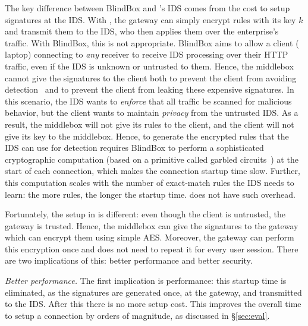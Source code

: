 The key difference between BlindBox and \sys's IDS comes from the cost to setup signatures at the IDS. 
With \sys, the gateway can simply encrypt rules with its key $k$ and transmit them to the IDS, who then applies them over the enterprise's traffic.
With BlindBox, this is not appropriate.
BlindBox aims to allow a client (\eg{} laptop) connecting to {\em any} receiver to receive IDS processing over their HTTP traffic, even if the IDS is unknown or untrusted to them.
Hence, the middlebox cannot give the signatures to the client both to prevent the client from avoiding detection~\cite{Bro} and to prevent the client from leaking these expensive signatures. 
In this scenario, the IDS wants to {\it enforce} that all traffic be scanned for malicious behavior, but the client wants to maintain {\it privacy} from the untrusted IDS.
As a result, the middlebox will not give its rules to the client, and the client will not give its key to the middlebox.
Hence,  to generate the encrypted rules that the IDS can use for detection requires BlindBox to perform
a sophisticated cryptographic computation (based on a primitive called garbled circuits~\cite{Yao82}) at the start of each connection, which makes the connection
startup time slow. 
Further, this computation scales with the number of exact-match rules the IDS needs to learn: the more rules, the longer the startup time.
\sys does not have such overhead.

Fortunately, the setup in \sys is different: even though the client is untrusted, the gateway is trusted. Hence, the middlebox can give the signatures to the gateway which can encrypt them using simple AES. Moreover, the gateway can perform this encryption once and does not need to repeat it for every user session. 
There are two implications of this: better performance and better security.

\textit{Better performance.}
The first implication is performance: this startup time is eliminated, as the signatures are generated once, at the gateway, and transmitted to the IDS. After this there is no more setup cost. This improves the overall time to setup a connection by orders of magnitude, as discussed in \S\ref{sec:eval}. 

